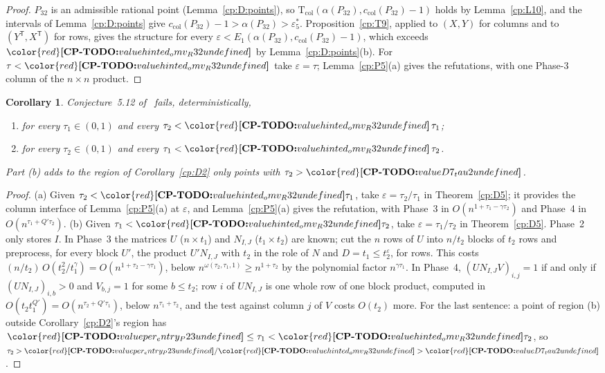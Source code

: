 \documentclass[11pt]{article}
\makeatletter
\newtheorem{corollary}[theorem]{Corollary}
\theoremstyle{definition}
\theoremstyle{remark}
\DeclareRobustCommand{\CPTODO}[1]{{\color{red}\textbf{[CP-TODO:} #1\textbf{]}}}
\providecommand{\eps}{\varepsilon}
\newcommand{\es}{\varepsilon^*_5}             %
\newcommand{\ccol}{c_{\mathrm{col}}}          %
\newcommand{\Tcol}{\mathrm{T}_{\mathrm{col}}} %
\newcommand{\Pthree}{P_{32}}                  %
\newcommand{\cpv}[1]{\ifcsname cpv@#1\endcsname\csname cpv@#1\endcsname\else\CPTODO{value #1 undefined}\fi}
\makeatother
\begin{document}
\begin{proof}
$\Pthree$ is an admissible rational point (Lemma~\ref{cp:D:points}), so $\Tcol(\alpha(\Pthree),\ccol(\Pthree)-1)$ holds by Lemma~\ref{cp:L10}, and the intervals of Lemma~\ref{cp:D:points} give $\ccol(\Pthree)-1>\alpha(\Pthree)>\es$. Proposition~\ref{cp:T9}, applied to $(X,Y)$ for columns and to $(Y^{\mathsf T},X^{\mathsf T})$ for rows, gives the structure for every $\eps<E_1(\alpha(\Pthree),\ccol(\Pthree)-1)$, which exceeds $\cpv{hinted_omv_R32}$ by Lemma~\ref{cp:D:points}(b). For $\tau<\cpv{hinted_omv_R32}$ take $\eps=\tau$; Lemma~\ref{cp:P5}(a) gives the refutations, with one Phase-3 column of the $n\times n$ product.
\end{proof}

\begin{corollary}\label{cp:D6}
Conjecture~5.12 of~\cite{BNS19} fails, deterministically,
\begin{enumerate}[label=(\alph*),ref=\thetheorem(\alph*)]
\item for every $\tau_1\in(0,1)$ and every $\tau_2<\cpv{hinted_omv_R32}\,\tau_1$;
\item\label{cp:D7} for every $\tau_2\in(0,1)$ and every $\tau_1<\cpv{hinted_omv_R32}\,\tau_2$.
\end{enumerate}
Part (b) adds to the region of Corollary~\ref{cp:D2} only points with $\tau_2>\cpv{D7_tau2}$.
\end{corollary}

\begin{proof}
(a) Given $\tau_2<\cpv{hinted_omv_R32}\tau_1$, take $\eps=\tau_2/\tau_1$ in Theorem~\ref{cp:D5}; it provides the column interface of Lemma~\ref{cp:P5}(a) at $\eps$, and Lemma~\ref{cp:P5}(a) gives the refutation, with Phase~3 in $O(n^{1+\tau_1-\gamma\tau_2})$ and Phase~4 in $O(n^{\tau_1+Q'\tau_2})$.
(b) Given $\tau_1<\cpv{hinted_omv_R32}\tau_2$, take $\eps=\tau_1/\tau_2$ in Theorem~\ref{cp:D5}. Phase~2 only stores $I$. In Phase~3 the matrices $U$ ($n\times t_1$) and $N_{I,J}$ ($t_1\times t_2$) are known; cut the $n$ rows of $U$ into $n/t_2$ blocks of $t_2$ rows and preprocess, for every block $U'$, the product $U'N_{I,J}$ with $t_2$ in the role of $N$ and $D=t_1\le t_2^\eps$, for rows. This costs $(n/t_2)\,O(t_2^2/t_1^\gamma)=O(n^{1+\tau_2-\gamma\tau_1})$, below $n^{\omega(\tau_2,\tau_1,1)}\ge n^{1+\tau_2}$ by the polynomial factor $n^{\gamma\tau_1}$. In Phase~4, $(UN_{I,J}V)_{i,j}=1$ if and only if $(UN_{I,J})_{i,b}>0$ and $V_{b,j}=1$ for some $b\le t_2$; row $i$ of $UN_{I,J}$ is one whole row of one block product, computed in $O(t_2t_1^{Q'})=O(n^{\tau_2+Q'\tau_1})$, below $n^{\tau_1+\tau_2}$, and the test against column $j$ of $V$ costs $O(t_2)$ more.
For the last sentence: a point of region (b) outside Corollary~\ref{cp:D2}'s region has $\cpv{per_entry_P23}\le\tau_1<\cpv{hinted_omv_R32}\tau_2$, so $\tau_2>\cpv{per_entry_P23}/\cpv{hinted_omv_R32}>\cpv{D7_tau2}$.
\end{proof}
\end{document}
